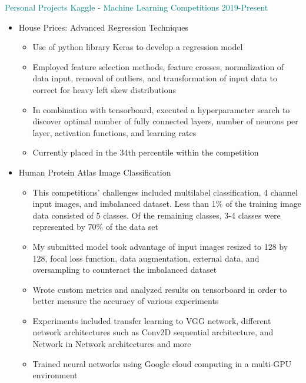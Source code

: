\documentclass[11pt]{ltxdoc}
\begin{document}
		{\textcolor{teal}{Personal Projects} \hfill \textcolor{teal}{Kaggle - Machine Learning Competitions} \hfill \textcolor{teal}{2019-Present}}
		\begin{itemize}
        	  \item House Prices: Advanced Regression Techniques
        	    \begin{itemize}
        	      \item Use of python library Keras to develop a regression model
        	      \item Employed feature selection methods, feature crosses, normalization of data input, removal of outliers, and transformation of input data to correct for heavy left skew distributions
        	      \item In combination with tensorboard, executed a hyperparameter search to discover optimal number of fully connected layers, number of neurons per layer, activation functions, and learning rates
        	      \item Currently placed in the 34th percentile within the competition
        	    \end{itemize}
        	  \item Human Protein Atlas Image Classification
        	    \begin{itemize}
        	      \item This competitions' challenges included multilabel classification, 4 channel input images, and imbalanced dataset. Less than 1\% of the training image data consisted of 5 classes. Of the remaining classes, 3-4 classes were represented by 70\% of the data set
        	      \item My submitted model took advantage of input images resized to 128 by 128, focal loss function, data augmentation, external data, and oversampling to counteract the imbalanced dataset
        	      \item Wrote custom metrics and analyzed results on tensorboard in order to better measure the accuracy of various experiments
        	      \item Experiments included transfer learning to VGG network, different network architectures such as Conv2D sequential architecture, and Network in Network architectures and more
        	      \item Trained neural networks using Google cloud computing in a multi-GPU environment
        	    \end{itemize}
        	\end{itemize}
        	
\end{document}

